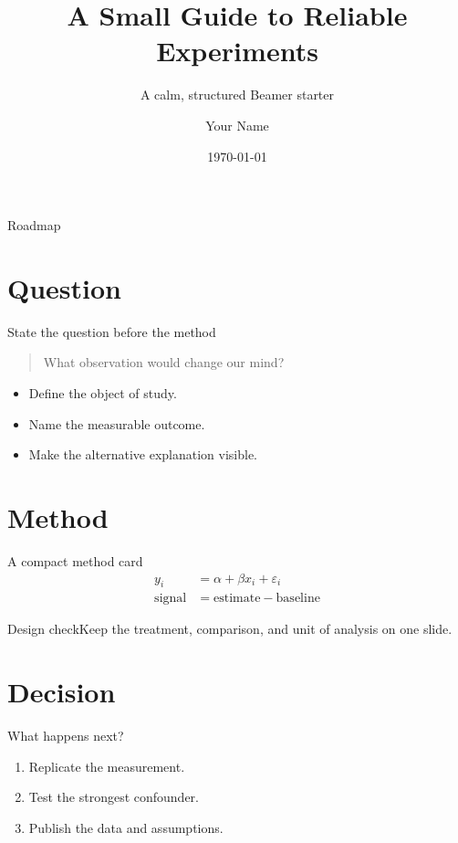 \documentclass[aspectratio=169,10pt]{beamer}
\title{A Small Guide to Reliable Experiments}\subtitle{A calm, structured Beamer starter}\author{Your Name}\institute{Your Lab}\date{\today}
\begin{document}
\begin{frame}[plain]\vspace*{1.5cm}\color{white}\Huge\bfseries\inserttitle\par\vspace{0.3cm}\Large\insertsubtitle\par\vfill\normalsize\insertauthor\quad\textbullet\quad\insertinstitute\par\insertdate\end{frame}
\begin{frame}{Roadmap}\tableofcontents\end{frame}
\section{Question}\begin{frame}{State the question before the method}\begin{quote}\large What observation would change our mind?\end{quote}\vfill\begin{itemize}\item Define the object of study.\item Name the measurable outcome.\item Make the alternative explanation visible.\end{itemize}\end{frame}
\section{Method}\begin{frame}{A compact method card}\begin{align*}y_i &= \alpha + \beta x_i + \varepsilon_i\\[2pt]\text{signal} &= \text{estimate} - \text{baseline}\end{align*}\begin{alertblock}{Design check}Keep the treatment, comparison, and unit of analysis on one slide.\end{alertblock}\end{frame}
\section{Decision}\begin{frame}{What happens next?}\begin{enumerate}\item Replicate the measurement.\item Test the strongest confounder.\item Publish the data and assumptions.\end{enumerate}\end{frame}
\end{document}
